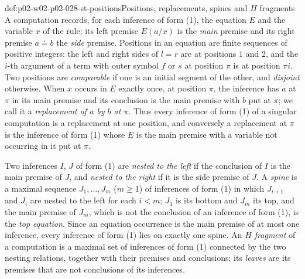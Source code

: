 \begin{hbdefinition}{def:p02-w02-p02-028-st-positions}{Positions, replacements, spines and \(H\) fragments}
A computation records, for each inference of form (1), the equation \(E\)
and the variable \(x\) of the rule; its left premise \(E(a/x)\) is the
\emph{main} premise and its right premise \(a\doteq b\) the \emph{side}
premise.  Positions in an equation are finite sequences of positive
integers: the left and right sides of \(l=r\) are at positions \(1\) and
\(2\), and the \(i\)-th argument of a term with outer symbol \(f\) or \(s\)
at position \(\pi\) is at position \(\pi i\).  Two positions are
\emph{comparable} if one is an initial segment of the other, and
\emph{disjoint} otherwise.  When \(x\) occurs in \(E\) exactly once, at
position \(\pi\), the inference has \(a\) at \(\pi\) in its main premise and
its conclusion is the main premise with \(b\) put at \(\pi\); we call it a
\emph{replacement of \(a\) by \(b\) at \(\pi\)}.  Thus every inference of
form (1) of a singular computation is a replacement at one position, and
conversely a replacement at \(\pi\) is the inference of form (1) whose
\(E\) is the main premise with a variable not occurring in it put at \(\pi\).

Two inferences \(I\), \(J\) of form (1) are \emph{nested to the left} if the
conclusion of \(I\) is the main premise of \(J\), and \emph{nested to the
right} if it is the side premise of \(J\).  A \emph{spine} is a maximal
sequence \(J_1,\ldots,J_m\) (\(m\geq1\)) of inferences of form (1) in which
\(J_{i+1}\) and \(J_i\) are nested to the left for each \(i<m\); \(J_1\) is
its bottom and \(J_m\) its top, and the main premise of \(J_m\), which is not
the conclusion of an inference of form (1), is the \emph{top equation}.
Since an equation occurrence is the main premise of at most one inference,
every inference of form (1) lies on exactly one spine.  An \emph{\(H\)
fragment} of a computation is a maximal set of inferences of form (1)
connected by the two nesting relations, together with their premises and
conclusions; its \emph{leaves} are its premises that are not conclusions of
its inferences.
\end{hbdefinition}

